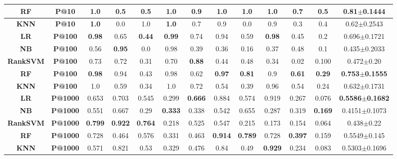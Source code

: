 \begin{table}[t!]
{{\begin{tabular}{|c|c|c|c|c|c|c|c|c|c|c|c|c|}
\hline 
\textbf{RF} & \textbf{P@10} & \textbf{1.0} & 0.5 & 0.5 & \textbf{1.0} & \textbf{0.9} & \textbf{1.0} & \textbf{1.0} & \textbf{1.0} & \textbf{0.7} & 0.5 & \textbf{0.81$\pm$0.1444}\tabularnewline
\hline 
\textbf{KNN} & \textbf{P@10} & \textbf{1.0} & 0.0 & 1.0 & \textbf{1.0} & 0.7 & 0.9 & 0.0 & 0.9 & 0.3 & 0.4 & 0.62$\pm$0.2543\tabularnewline
\hline 
\hline 
\textbf{LR} & \textbf{P@100} & \textbf{0.98} & 0.65 & \textbf{0.44} & \textbf{0.99} & 0.74 & 0.94 & 0.59 & \textbf{0.98} & 0.45 & 0.2 & 0.696$\pm$0.1721\tabularnewline
\hline 
\textbf{NB} & \textbf{P@100} & 0.56 & \textbf{0.95} & 0.0 & 0.98 & 0.39 & 0.36 & 0.16 & 0.37 & 0.48 & 0.1 & 0.435$\pm$0.2033\tabularnewline
\hline 
\textbf{RankSVM} & \textbf{P@100} & 0.73 & 0.72 & 0.31 & 0.70 & \textbf{0.88} & 0.44 & 0.48 & 0.34 & 0.02 & 0.100 & 0.472$\pm$0.20\tabularnewline
\hline 
\textbf{RF} & \textbf{P@100} & \textbf{0.98} & 0.94 & 0.43 & 0.98 & 0.62 & \textbf{0.97} & \textbf{0.81} & 0.9 & \textbf{0.61} & \textbf{0.29} & \textbf{0.753$\pm$0.1555}\tabularnewline
\hline 
\textbf{KNN} & \textbf{P@100} & 1.0 & 0.59 & 0.34 & 1.0 & 0.72 & 0.54 & 0.39 & 0.96 & 0.54 & 0.24 & 0.632$\pm$0.1731\tabularnewline
\hline 
\hline 
\textbf{LR} & \textbf{P@1000} & 0.653 & 0.703 & 0.545 & 0.299 & \textbf{0.666} & 0.884 & 0.574 & 0.919 & 0.267 & 0.076 & \textbf{0.5586$\pm$0.1682}\tabularnewline
\hline 
\textbf{NB} & \textbf{P@1000} & 0.551 & 0.667 & 0.29 & \textbf{0.333} & 0.338 & 0.542 & 0.655 & 0.287 & 0.319 & \textbf{0.169} & 0.4151$\pm$0.1073\tabularnewline
\hline 
\textbf{RankSVM} & \textbf{P@1000} & \textbf{0.799} & \textbf{0.922} & \textbf{0.764} & 0.218 & 0.525 & 0.547 & 0.215 & 0.173 & 0.154 & 0.064 & 0.438$\pm$0.22\tabularnewline
\hline 
\textbf{RF} & \textbf{P@1000} & 0.728 & 0.464 & 0.576 & 0.331 & 0.463 & \textbf{0.914} & \textbf{0.789} & 0.728 & \textbf{0.397} & 0.159 & 0.5549$\pm$0.145\tabularnewline
\hline 
\textbf{KNN} & \textbf{P@1000} & 0.571 & 0.821 & 0.53 & 0.329 & 0.476 & 0.84 & 0.49 & \textbf{0.929} & 0.234 & 0.083 & 0.5303$\pm$0.1696\tabularnewline
\hline 
\end{tabular}




}}
\label{table:results2}
\end{table}

